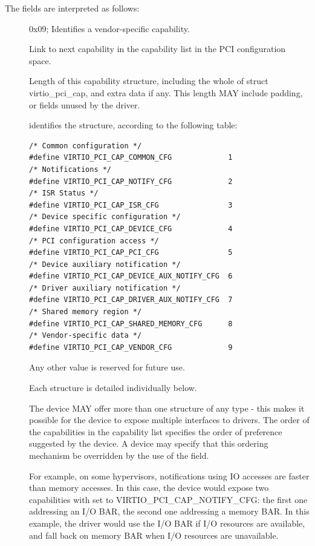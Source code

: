The fields are interpreted as follows:

\begin{description}
\item[]
        0x09; Identifies a vendor-specific capability.

\item[]
        Link to next capability in the capability list in the PCI configuration space.

\item[]
        Length of this capability structure, including the whole of
        struct virtio_pci_cap, and extra data if any.
        This length MAY include padding, or fields unused by the driver.

\item[]
        identifies the structure, according to the following table:

\begin{lstlisting}
/* Common configuration */
#define VIRTIO_PCI_CAP_COMMON_CFG             1
/* Notifications */
#define VIRTIO_PCI_CAP_NOTIFY_CFG             2
/* ISR Status */
#define VIRTIO_PCI_CAP_ISR_CFG                3
/* Device specific configuration */
#define VIRTIO_PCI_CAP_DEVICE_CFG             4
/* PCI configuration access */
#define VIRTIO_PCI_CAP_PCI_CFG                5
/* Device auxiliary notification */
#define VIRTIO_PCI_CAP_DEVICE_AUX_NOTIFY_CFG  6
/* Driver auxiliary notification */
#define VIRTIO_PCI_CAP_DRIVER_AUX_NOTIFY_CFG  7
/* Shared memory region */
#define VIRTIO_PCI_CAP_SHARED_MEMORY_CFG      8
/* Vendor-specific data */
#define VIRTIO_PCI_CAP_VENDOR_CFG             9
\end{lstlisting}

        Any other value is reserved for future use.

        Each structure is detailed individually below.

        The device MAY offer more than one structure of any type - this makes it
        possible for the device to expose multiple interfaces to drivers.  The order of
        the capabilities in the capability list specifies the order of preference
        suggested by the device.  A device may specify that this ordering mechanism be
        overridden by the use of the  field.
        \begin{note}
          For example, on some hypervisors, notifications using IO accesses are
        faster than memory accesses. In this case, the device would expose two
        capabilities with  set to VIRTIO_PCI_CAP_NOTIFY_CFG:
        the first one addressing an I/O BAR, the second one addressing a memory BAR.
        In this example, the driver would use the I/O BAR if I/O resources are available, and fall back on
        memory BAR when I/O resources are unavailable.
        \end{note}


\end{description}
